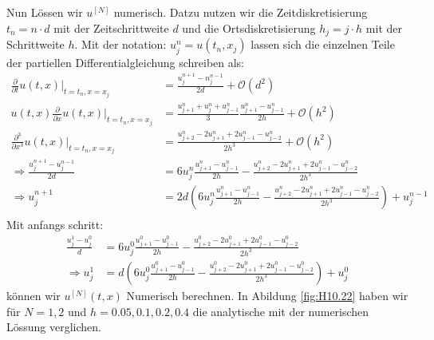 \documentclass[ngerman]{scrartcl}
\begin{document}
\subsection{}
Nun L\"ossen wir $u^{[N]}$ numerisch.
Datzu nutzen wir die Zeitdiskretisierung $t_n = n \cdot d$ mit der Zeitschrittweite $d$
und die Ortsdiskretisierung $h_j = j \cdot h$ mit der Schrittweite $h$.
Mit der notation: $u_j^n=u(t_n,x_j)$ lassen sich die einzelnen Teile der partiellen Differentialgleichung schreiben als:
\begin{align*}
	\frac{\partial}{\partial t}u(t,x) \bigg|_{t=t_n, x=x_j} &=\frac{u_j^{n+1}-n_j^{n-1}}{2d} + \mathcal O(d^2) \\
	u(t,x) \frac{\partial}{\partial x}u(t,x) \bigg|_{t=t_n, x=x_j} &=\frac{u_{j+1}^n + u_j^n + u_{j-1}^n}{3} \frac{u_{j+1}^n - u_{j-1}^n}{2h} + \mathcal O(h^2) \\
	\frac{\partial^3}{\partial x^3}u(t,x) \bigg|_{t=t_n, x=x_j} &=\frac{u_{j+2}^n - 2 u_{j+1}^n + 2 u_{j-1}^n - u_{j-2}^n}{2h^3} + \mathcal O(h^2) \\
	\Rightarrow\frac{u_j^{n+1} - u_j^{n-1}}{2d} &= 6u_j^n \frac{u_{j+1}^n - u_{j-1}^n}{2h} - \frac{u_{j+2}^n - 2u_{j+1}^n + 2u_{j-1}^n - u_{j-2}^n}{2h^3}\\
	\Rightarrow u_j^{n+1} &= 2d\left(6u_j^n \frac{u_{j+1}^n - u_{j-1}^n}{2h} - \frac{u_{j+2}^n - 2u_{j+1}^n + 2u_{j-1}^n - u_{j-2}^n}{2h^3}\right)+u_j^{n-1}\\
	\label{Formeln:Diskretisierung}
\end{align*}
Mit anfangs schritt:
\begin{align*}
	\frac{u_j^1 - u_j^0}{d} &= 6u_j^0 \frac{u_{j+1}^0 - u_{j-1}^0}{2h} - \frac{u_{j+2}^0 - 2u_{j+1}^0 + 2u_{j-1}^0 - u_{j-2}^0}{2h^3}\\
	\Rightarrow u_j^1 &=d\left(6u_j^0 \frac{u_{j+1}^0 - u_{j-1}^0}{2h} - \frac{u_{j+2}^0 - 2u_{j+1}^0 + 2u_{j-1}^0 - u_{j-2}^0}{2h^3}\right)+u_j^0
\end{align*}
k\"onnen wir $u^{[N]}(t,x)$ Numerisch berechnen.
In Abildung \ref{fig:H10.22} haben wir für $N=1,2$ und $h=0.05, 0.1, 0.2, 0.4$ die analytische mit der numerischen L\"ossung verglichen.
\end{document}
